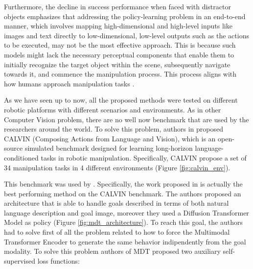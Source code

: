 \newline Furthermore, the decline in success performance when faced with distractor objects emphasizes that addressing the policy-learning problem in an end-to-end manner, which involves mapping high-dimensional and high-level inputs like images and text directly to low-dimensional, low-level outputs such as the actions to be executed, may not be the most effective approach. This is because such models might lack the necessary perceptual components that enable them to initially recognize the target object within the scene, subsequently navigate towards it, and commence the manipulation process. This process aligns with how humans approach manipulation tasks \cite{grill2003neural}.


As we have seen up to now, all the proposed methods were tested on different robotic platforms with different scenarios and environments. As in other Computer Vision problem, there are no well now benchmark that are used by the researchers around the world. To solve this problem, authors in \cite{mees2022calvin} proposed CALVIN (Composing Actions from Language and Vision), which is an open-source simulated benchmark designed for learning long-horizon language-conditioned tasks in robotic manipulation. Specifically, CALVIN propose a set of 34 manipulation tasks in 4 different environments (Figure \ref{fig:calvin_env}). 

This benchmark was used by \cite{mees2022hulc,mees2023hulc++,reuss2024multimodal}. Specifically, the work proposed in \cite{reuss2024multimodal} is actually the best performing method on the CALVIN benchmark. The authors proposed an architecture that is able to handle goals described in terms of both natural language description and goal image, moreover they used a Diffusion Transformer Model as policy (Figure \ref{fig:mdt_architecture}). To reach this goal, the authors had to solve first of all the problem related to how to force the Multimodal Transformer Encoder to generate the same behavior indipendently from the goal modality. To solve this problem authors of MDT proposed two auxiliary self-supervised loss functions:
